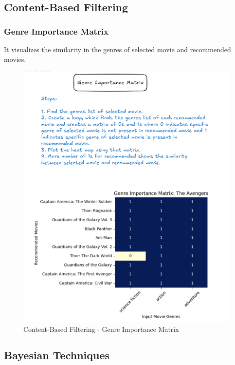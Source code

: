 \documentclass[a4paper]{article}
\theoremstyle{plain}
\begin{document}
\subsection{Content-Based Filtering}

\subsubsection{Genre Importance Matrix}
It visualizes the similarity in the genres of selected movie and recommended movies.
\begin{figure}[H]
    \centering
    \includegraphics[width=\linewidth]{cbf_vis2.png}
    \caption{Content-Based Filtering - Genre Importance Matrix}
    \label{fig:cbf}
\end{figure}

\subsection{Bayesian Techniques}
\end{document}
